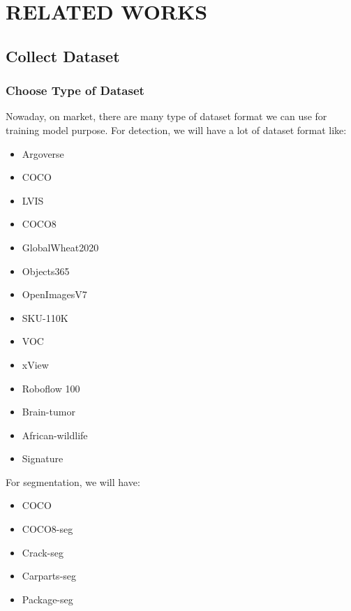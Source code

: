 \chapter{RELATED WORKS}

\renewcommand{\headrulewidth}{0.5pt}
\renewcommand{\footrulewidth}{0.5pt}
\thispagestyle{plain}
\pagestyle{fancy}
\fancyhf{}
\raggedright
{}

\justifying

\section{Collect Dataset}
    \subsection{Choose Type of Dataset}
        Nowaday, on market, there are many type of dataset format we can use for training model purpose. For detection, we will have a lot of dataset format like:
        \begin{itemize}
            \item Argoverse
            \item COCO
            \item LVIS
            \item COCO8
            \item GlobalWheat2020
            \item Objects365
            \item OpenImagesV7
            \item SKU-110K
            \item VOC
            \item xView
            \item Roboflow 100
            \item Brain-tumor
            \item African-wildlife 
            \item Signature
        \end{itemize}
        For segmentation, we will have:
        \begin{itemize}
            \item COCO 
            \item COCO8-seg 
            \item Crack-seg 
            \item Carparts-seg 
            \item Package-seg 
        \end{itemize}
